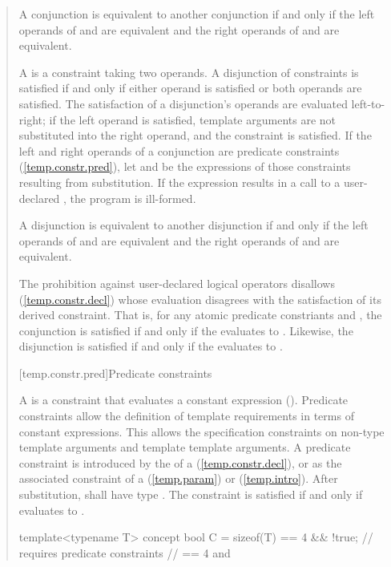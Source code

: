 \begin{quote}
A conjunction  is equivalent to another conjunction 
if and only if the left operands of  and  are equivalent
and the right operands of  and  are equivalent.

\pnum
A  is a constraint taking two 
operands. A disjunction of constraints is satisfied if and only 
if either operand is satisfied or both operands are satisfied.
% 
The satisfaction of a disjunction's operands are evaluated left-to-right; 
if the left operand is satisfied, template arguments are not 
substituted into the right operand, and the constraint is satisfied.
%
If the left and right operands of a conjunction are predicate constraints
(\ref{temp.constr.pred}), let  and  be the expressions
of those constraints resulting from substitution. If the expression
 results in a call to a user-declared ,
the program is ill-formed.

A disjunction  is equivalent to another disjunction 
if and only if the left operands of  and  are equivalent
and the right operands of  and  are equivalent.

\pnum
\enternote
The prohibition against user-declared logical operators disallows
 (\ref{temp.constr.decl}) whose 
evaluation disagrees with the satisfaction of its derived constraint.
That is, for any atomic predicate constriants  and ,
the conjunction  is satisfied if and only if
the   evaluates to
. Likewise, the disjunction  is satisfied 
if and only if the  
evaluates to .
\exitnote


[temp.constr.pred]{Predicate constraints}

\pnum
A  is a constraint that evaluates a constant 
expression  ().
% 
\enternote
Predicate constraints allow the definition of template requirements
in terms of constant expressions. This allows the specification 
constraints on non-type template arguments and template template 
arguments.
\exitnote
% 
\enternote
A predicate constraint is introduced by the 
of a 
 (\ref{temp.constr.decl}), 
or as the associated constraint of a
 (\ref{temp.param}) or
 (\ref{temp.intro}).
\exitnote
% 
After substitution,  shall have type .
% 
The constraint is satisfied if and only if  evaluates to 
.
% 
\enterexample
\begin{codeblock}
template<typename T> 
  concept bool C = sizeof(T) == 4 && !true; // requires predicate constraints
                                            //  == 4 and 


\end{codeblock}
\end{quote}
